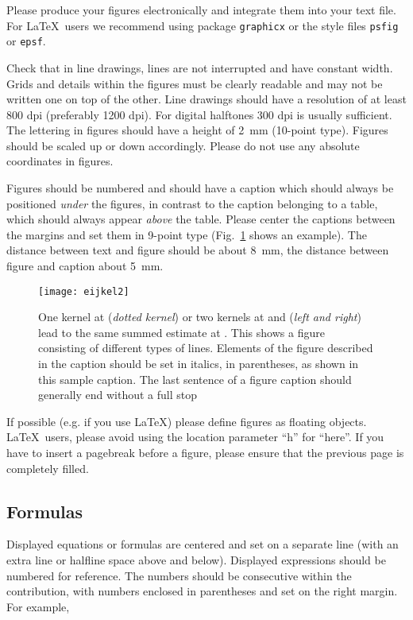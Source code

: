 \documentclass[runningheads]{llncs}
\begin{document}
Please produce your figures electronically and integrate
them into your text file. For \LaTeX\ users we recommend using package
\verb+graphicx+ or the style files \verb+psfig+ or \verb+epsf+.

Check that in line drawings, lines are not
interrupted and have constant width. Grids and details within the
figures must be clearly readable and may not be written one on top of
the other. Line drawings should have a resolution of at least 800 dpi
(preferably 1200 dpi).
For digital halftones 300 dpi is usually sufficient.
The lettering in figures should have a height of 2~mm (10-point type).
Figures should be scaled up or down accordingly.
Please do not use any absolute coordinates in figures.

Figures should be numbered and should have a caption which should
always be positioned {\it under} the figures, in contrast to the caption
belonging to a table, which should always appear {\it above} the table.
Please center the captions between the margins and set them in
9-point type
(Fig.~\ref{fig:example} shows an example).
The distance between text and figure should be about 8~mm, the
distance between figure and caption about 5~mm.
\begin{figure}
\centering
\texttt{[image: eijkel2]}
\caption{One kernel at  ({\it dotted kernel}) or two kernels at
 and  ({\it left and right}) lead to the same summed estimate
at . This shows a figure consisting of different types of
lines. Elements of the figure described in the caption should be set in
italics,
in parentheses, as shown in this sample caption. The last
sentence of a figure caption should generally end without a full stop}
\label{fig:example}
\end{figure}

If possible (e.g. if you use \LaTeX) please define figures as floating
objects. \LaTeX\ users, please avoid using the location
parameter ``h'' for ``here''. If you have to insert a pagebreak before a
figure, please ensure that the previous page is completely filled.


\subsection{Formulas}

Displayed equations or formulas are centered and set on a separate
line (with an extra line or halfline space above and below). Displayed
expressions should be numbered for reference. The numbers should be
consecutive within the contribution,
with numbers enclosed in parentheses and set on the right margin.
For example,
\end{document}
